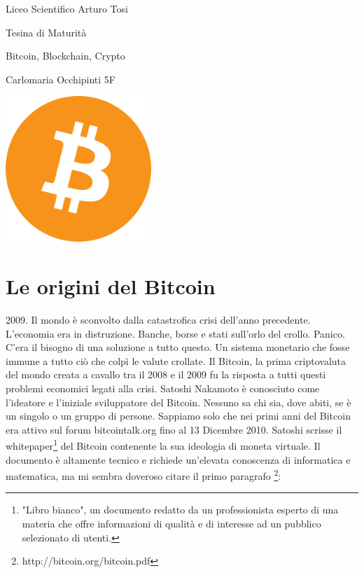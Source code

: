 \documentclass {article}
\begin{document}
\begin {titlepage}

\centering
{\LARGE Liceo Scientifico Arturo Tosi \par}
\vspace{1cm}
{\Large Tesina di Maturità\par}
\vspace{1.5cm}
{\huge Bitcoin, Blockchain, Crypto\par}
\vspace{2cm}
{\Large Carlomaria Occhipinti 5F\par}
\vfill
\includegraphics [width = 5.5cm] {logo.png}
\vfill

\end {titlepage}


\newpage

\tableofcontents
{}

\newpage


\section {Le origini del Bitcoin}


2009. Il mondo è sconvolto dalla catastrofica crisi dell'anno precedente.
L'economia era in distruzione. Banche, borse e stati sull'orlo del crollo. Panico.
C'era il bisogno di una soluzione a tutto questo. Un sistema monetario che fosse immune a tutto ciò che colpì le valute crollate. Il Bitcoin, la prima criptovaluta del mondo creata a cavallo tra il 2008 e il 2009 fu la risposta a tutti questi problemi economici legati alla crisi.
Satoshi Nakamoto è conosciuto come l'ideatore e l'iniziale sviluppatore del Bitcoin. Nessuno sa chi sia, dove abiti, se è un singolo o un gruppo di persone. Sappiamo solo che nei primi anni del Bitcoin era attivo sul forum bitcointalk.org fino al 13 Dicembre 2010.
Satoshi scrisse il whitepaper\footnote{"Libro bianco", un documento redatto da un professionista esperto di una materia che offre informazioni di qualità e di interesse ad un pubblico selezionato di utenti.} del Bitcoin contenente la sua ideologia di moneta virtuale. Il documento è altamente tecnico e richiede un'elevata conoscenza di informatica e matematica, ma mi sembra doveroso citare il primo paragrafo \footnote{http://bitcoin.org/bitcoin.pdf}:\\
\end{document}
